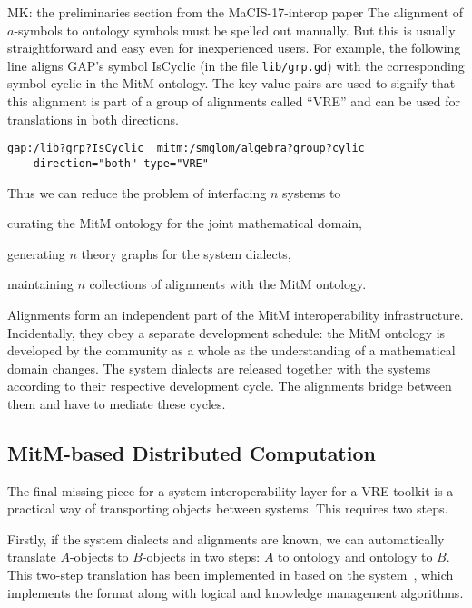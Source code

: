\begin{newpart}{MK: the preliminaries section from the MaCIS-17-interop paper}
The alignment of $a$-symbols to ontology symbols must be spelled out manually.
But this is usually straightforward and easy even for inexperienced users. For example, the following line aligns GAP's symbol \textsf{IsCyclic} (in the file \lstinline|lib/grp.gd|) with the corresponding symbol \textsf{cyclic} in the MitM ontology.
The key-value pairs are used to signify that this alignment is part of a group of alignments called ``VRE'' and can be used for translations in both directions.

\begin{verbatim}
gap:/lib?grp?IsCyclic  mitm:/smglom/algebra?group?cylic
    direction="both" type="VRE"
\end{verbatim}

Thus we can reduce the problem of interfacing $n$ systems to
\begin{inparaenum}[\em i\rm)]
\item curating the MitM ontology for the joint mathematical domain,
\item generating $n$ theory graphs for the system dialects,
\item maintaining $n$ collections of alignments with the MitM ontology.
\end{inparaenum}

Alignments form an independent part of the MitM interoperability infrastructure.
Incidentally, they obey a separate development schedule: the MitM ontology is developed by the community as a whole as the understanding of a mathematical domain changes.
The system dialects are released together with the systems according to their respective development cycle.
The alignments bridge between them and have to mediate these cycles.

\subsection{MitM-based Distributed Computation}\label{sec:mitm:comms}

The final missing piece for a system interoperability layer for a VRE toolkit is a practical way of transporting objects between systems.
This requires two steps.

Firstly, if the system dialects and alignments are known, we can automatically translate $A$-objects to $B$-objects in two steps: $A$ to ontology and ontology to $B$.
This two-step translation has been implemented in \cite{MueRoYuRa:abtafs17} based on the \MMT system~\cite{Rabe:MAGMS13,uniformal:on}, which implements the \OMMT format along with logical and knowledge management algorithms.


\end{newpart}
